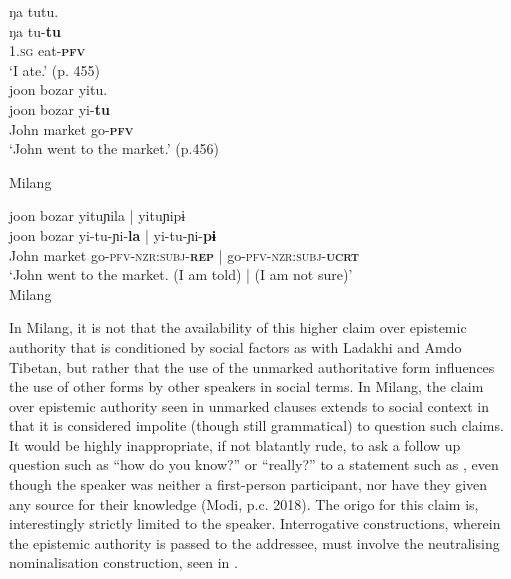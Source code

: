 \begin{exe}
    \ex\label{e:Discussion:MilangEgo}
    \begin{xlist}
        \ex \label{e:Discussion:MilangEgo1}
        \glll ŋa tutu. \\
        ŋa tu-\textbf{tu} \\
        1.\textsc{sg} eat-\textsc{\textbf{pfv}} \\
        \glt `I ate.' (p. 455) \\

        \ex \label{e:Discussion:MilangEgo2}
        \glll joon bozar yitu. \\
        joon bozar yi-\textbf{tu} \\
        John market go-\textsc{\textbf{pfv}} \\
        \glt `John went to the market.' (p.456) \\
    \end{xlist}
    Milang \cite[Siangic: India,][]{Modi2017}
\end{exe}
\begin{exe}
    \ex \label{e:Discussion:MilangNonEgo}
    \glll joon bozar yituɲila | yituɲipɨ \\
    joon bozar yi-tu-ɲi-\textbf{la} | yi-tu-ɲi-\textbf{pɨ} \\
    John market go-\textsc{pfv}-\textsc{nzr:subj}-\textsc{\textbf{rep}} | go-\textsc{pfv}-\textsc{nzr:subj}-\textsc{\textbf{ucrt}} \\
    \glt `John went to the market. (I am told) | (I am not sure)' \\
    Milang \cite[Siangic: India][457, given as two examples in source and combined here]{Modi2017}
\end{exe}

In Milang, it is not that the availability of this higher claim over epistemic authority that is conditioned by social factors as with Ladakhi and Amdo Tibetan, but rather that the use of the unmarked authoritative form influences the use of other forms by other speakers in social terms. In Milang, the claim over epistemic authority seen in unmarked clauses extends to social context in that it is considered impolite (though still grammatical) to question such claims. It would be highly inappropriate, if not blatantly rude, to ask a follow up question such as ``how do you know?'' or ``really?'' to a statement such as , even though the speaker was neither a first-person participant, nor have they given any source for their knowledge (Modi, p.c. 2018). The origo for this claim is, interestingly strictly limited to the speaker. Interrogative constructions, wherein the epistemic authority is passed to the addressee, must involve the neutralising nominalisation construction, seen in  \cite[457]{Modi2017}.

